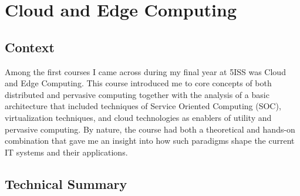 \section{Cloud and Edge Computing}
\subsection{Context}
\indent \indent Among the first courses I came across during my final year at 5ISS was Cloud and Edge Computing. This course introduced me to core concepts of both distributed and pervasive computing together with the analysis of a basic architecture that included techniques of Service Oriented Computing (SOC), virtualization techniques, and cloud technologies as enablers of utility and pervasive computing. By nature, the course had both a theoretical and hands-on combination that gave me an insight into how such paradigms shape the current IT systems and their applications.

\subsection{Technical Summary} %


